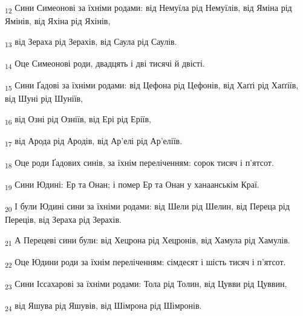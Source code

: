 \begin{tcolorbox}
\textsubscript{12} Сини Симеонові за їхніми родами: від Немуїла рід Немуїлів, від Яміна рід Ямінів, від Яхіна рід Яхінів,
\end{tcolorbox}
\begin{tcolorbox}
\textsubscript{13} від Зераха рід Зерахів, від Саула рід Саулів.
\end{tcolorbox}
\begin{tcolorbox}
\textsubscript{14} Оце Симеонові роди, двадцять і дві тисячі й двісті.
\end{tcolorbox}
\begin{tcolorbox}
\textsubscript{15} Сини Ґадові за їхніми родами: від Цефона рід Цефонів, від Хаґґі рід Хаґґіїв, від Шуні рід Шуніїв,
\end{tcolorbox}
\begin{tcolorbox}
\textsubscript{16} від Озні рід Озніїв, від Ері рід Еріїв,
\end{tcolorbox}
\begin{tcolorbox}
\textsubscript{17} від Арода рід Ародів, від Ар'елі рід Ар'еліїв.
\end{tcolorbox}
\begin{tcolorbox}
\textsubscript{18} Оце роди Ґадових синів, за їхнім переліченням: сорок тисяч і п'ятсот.
\end{tcolorbox}
\begin{tcolorbox}
\textsubscript{19} Сини Юдині: Ер та Онан; і помер Ер та Онан у ханаанськім Краї.
\end{tcolorbox}
\begin{tcolorbox}
\textsubscript{20} І були Юдині сини за їхніми родами: від Шели рід Шелин, від Переца рід Переців, від Зераха рід Зерахів.
\end{tcolorbox}
\begin{tcolorbox}
\textsubscript{21} А Перецеві сини були: від Хецрона рід Хецронів, від Хамула рід Хамулів.
\end{tcolorbox}
\begin{tcolorbox}
\textsubscript{22} Оце Юдини роди за їхнім переліченням: сімдесят і шість тисяч і п'ятсот.
\end{tcolorbox}
\begin{tcolorbox}
\textsubscript{23} Сини Іссахарові за їхніми родами: Тола рід Толин, від Цувви рід Цуввин,
\end{tcolorbox}
\begin{tcolorbox}
\textsubscript{24} від Яшува рід Яшувів, від Шімрона рід Шімронів.
\end{tcolorbox}

